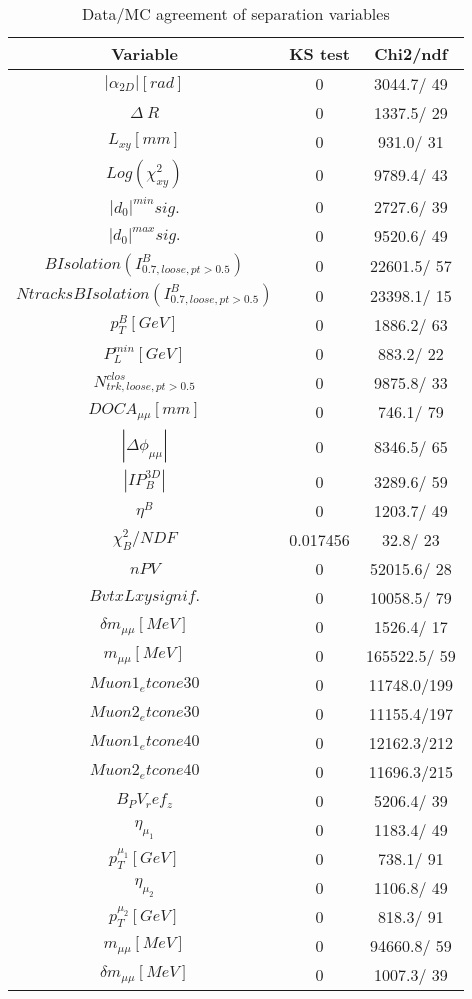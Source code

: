 \documentclass{article}
\begin{document}
\begin{table}[htbp]
\caption{\label{tab:sepVars}Data/MC agreement of separation variables}
\begin{center}
\begin{tabular}{c|c|c}
Variable & KS test & Chi2/ndf \\
\hline
$|\alpha_{2D}| [rad]$ & 0 & 3044.7/ 49\\
\hline
$\Delta~R$ & 0 & 1337.5/ 29\\
\hline
$L_{xy} [mm]$ & 0 & 931.0/ 31\\
\hline
$Log(\chi^{2}_{xy})$ & 0 & 9789.4/ 43\\
\hline
$|d_{0}|^{min} sig.$ & 0 & 2727.6/ 39\\
\hline
$|d_{0}|^{max} sig.$ & 0 & 9520.6/ 49\\
\hline
$B Isolation (I^{B}_{0.7, loose, pt>0.5})$ & 0 & 22601.5/ 57\\
\hline
$Ntracks B Isolation (I^{B}_{0.7, loose, pt>0.5})$ & 0 & 23398.1/ 15\\
\hline
$p_{T}^{B} [GeV]$ & 0 & 1886.2/ 63\\
\hline
$P^{min}_{L} [GeV]$ & 0 & 883.2/ 22\\
\hline
$N^{clos}_{trk, loose, pt>0.5}$ & 0 & 9875.8/ 33\\
\hline
$DOCA_{\mu\mu} [mm]$ & 0 & 746.1/ 79\\
\hline
$|\Delta\phi_{\mu\mu}|$ & 0 & 8346.5/ 65\\
\hline
$|IP_{B}^{3D}|$ & 0 & 3289.6/ 59\\
\hline
$\eta^{B}$ & 0 & 1203.7/ 49\\
\hline
$\chi^{2}_{B}/NDF$ & 0.017456 &  32.8/ 23\\
\hline
$nPV$ & 0 & 52015.6/ 28\\
\hline
$BvtxLxy signif.$ & 0 & 10058.5/ 79\\
\hline
$\delta m_{\mu\mu} [MeV]$ & 0 & 1526.4/ 17\\
\hline
$m_{\mu\mu} [MeV]$ & 0 & 165522.5/ 59\\
\hline
$Muon1_etcone30$ & 0 & 11748.0/199\\
\hline
$Muon2_etcone30$ & 0 & 11155.4/197\\
\hline
$Muon1_etcone40$ & 0 & 12162.3/212\\
\hline
$Muon2_etcone40$ & 0 & 11696.3/215\\
\hline
$B_PV_ref_z$ & 0 & 5206.4/ 39\\
\hline
$\eta_{\mu_{1}}$ & 0 & 1183.4/ 49\\
\hline
$p_{T}^{\mu_{1}} [GeV]$ & 0 & 738.1/ 91\\
\hline
$\eta_{\mu_{2}}$ & 0 & 1106.8/ 49\\
\hline
$p_{T}^{\mu_{2}} [GeV]$ & 0 & 818.3/ 91\\
\hline
$m_{\mu\mu} [MeV]$ & 0 & 94660.8/ 59\\
\hline
$\delta m_{\mu\mu} [MeV]$ & 0 & 1007.3/ 39\\
\hline
\end{tabular}
\end{center}
\end{table}
\end{document}
